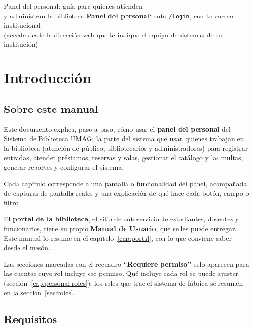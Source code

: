 \documentclass[11pt,a4paper]{report}
\begin{document}
\portadamanual
  {Panel del personal: guía para quienes atienden\\y administran la biblioteca}
  {\textbf{Panel del personal:} ruta \texttt{/login}, con tu correo institucional\\[6pt]
   {\small (accede desde la dirección web que te indique el equipo de sistemas de tu institución)}}

\tableofcontents
\clearpage

\chapter{Introducción}

\section{Sobre este manual}

Este documento explica, paso a paso, cómo usar el \textbf{panel del
personal} del Sistema de Biblioteca UMAG: la parte del sistema que usan
quienes trabajan en la biblioteca (atención de público, bibliotecarios y
administradores) para registrar entradas, atender préstamos, reservas y
salas, gestionar el catálogo y las multas, generar reportes y configurar el
sistema.

Cada capítulo corresponde a una pantalla o funcionalidad del panel,
acompañada de capturas de pantalla reales y una explicación de qué hace
cada botón, campo o filtro.

El \textbf{portal de la biblioteca}, el sitio de autoservicio de
estudiantes, docentes y funcionarios, tiene su propio \textbf{Manual de
Usuario}, que se les puede entregar. Este manual lo resume en el
capítulo~\ref{cap:portal}, con lo que conviene saber desde el mesón.

\begin{nota}
Las secciones marcadas con el recuadro \textbf{``Requiere permiso''} solo
aparecen para las cuentas cuyo rol incluye ese permiso. Qué incluye cada
rol se puede ajustar (sección~\ref{cap:personal-roles}); los roles que
trae el sistema de fábrica se resumen en la
sección~\ref{sec:roles}.
\end{nota}

\section{Requisitos}
\end{document}
